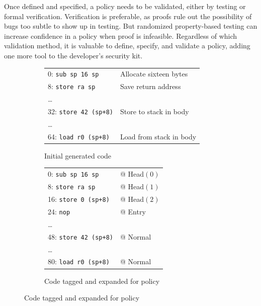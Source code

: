 \documentclass{report}
\begin{document}
Once defined and specified, a policy needs to be validated, either by testing or formal verification.
Verification is preferable, as proofs rule out the possibility of bugs too subtle to show up in testing.
But randomized property-based testing can increase confidence in a policy when proof is infeasible.
Regardless of which validation method, it is valuable to define, specify, and validate a policy,
adding one more tool to the developer's security kit.

\begin{figure}
  \begin{subfigure}[t]{0.55\textwidth}
    \vspace{0em}
    \begin{tabular}{l l}
      0: {\tt sub sp 16 sp} & Allocate sixteen bytes \\
      8: {\tt store ra sp} & Save return address \\
      \dots \\
      32: {\tt store 42 (sp+8)} & Store to stack in body \\
      \dots \\
      64: {\tt load r0 (sp+8)} & Load from stack in body \\
    \end{tabular}
    \caption{Initial generated code}
    \label{ex:call1}
  \end{subfigure}
  \begin{subfigure}[t]{0.45\textwidth}
    \vspace{0em}
    \begin{tabular}{l l}
      0: {\tt sub sp 16 sp} & @ {\sc Head}\((0)\) \\
      8: {\tt store ra sp} & @ {\sc Head}\((1)\) \\
      16: {\tt store 0 (sp+8)} & @ {\sc Head}\((2)\) \\
      24: {\tt nop} & @ {\sc Entry} \\
      \dots \\
      48: {\tt store 42 (sp+8)} & @ {\sc Normal} \\
      \dots \\
      80: {\tt load r0 (sp+8)} & @ {\sc Normal} \\
    \end{tabular}
    \caption{Code tagged and expanded for policy}
    \label{ex:call2}
  \end{subfigure}

  \vspace{\belowdisplayskip}
  

\end{figure}
\end{document}
